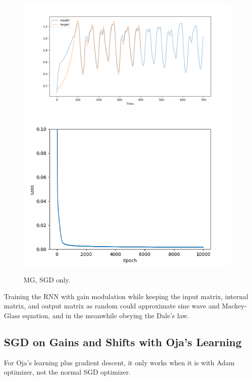 \documentclass[12pt, a4paper]{article}
\begin{document}
\begin{figure}[H]
    \centering
    \includegraphics[width=\textwidth]{RNN/ourRNN/analysis/fig/1016_MG_bpgain_output.png}
    \includegraphics[width=\textwidth]{RNN/ourRNN/analysis/fig/1016_MG_bpgain_loss.png}
    \caption{MG, SGD only.}
\end{figure}

Training the RNN with gain modulation while keeping the input matrix, internal matrix, and output matrix as random could approximate sine wave and Mackey-Glass equation, and in the meanwhile obeying the Dale's law.

\subsection*{SGD on Gains and Shifts with Oja's Learning}

For Oja's learning plus gradient descent, it only works when it is with Adam optimizer, not the normal SGD optimizer.
\end{document}
